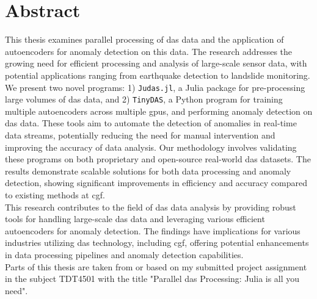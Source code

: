 \chapter*{Abstract}

This thesis examines parallel processing of \acrfull{das} data and the application of autoencoders for anomaly detection on this data. The research addresses the growing need for efficient processing and analysis of large-scale sensor data, with potential applications ranging from earthquake detection to landslide monitoring. \\

We present two novel programs: 1) \texttt{Judas.jl}, a Julia package for pre-processing large volumes of \acrshort{das} data, and 2) \texttt{TinyDAS}, a Python program for training multiple autoencoders across multiple \acrshort{gpu}s, and performing anomaly detection on \acrshort{das} data. These tools aim to automate the detection of anomalies in real-time data streams, potentially reducing the need for manual intervention and improving the accuracy of data analysis.
Our methodology involves validating these programs on both proprietary and open-source real-world \acrshort{das} datasets. The results demonstrate scalable solutions for both data processing and anomaly detection, showing significant improvements in efficiency and accuracy compared to existing methods at \acrfull{cgf}. \\

This research contributes to the field of \acrshort{das} data analysis by providing robust tools for handling large-scale \acrshort{das} data and leveraging various efficient autoencoders for anomaly detection. The findings have implications for various industries utilizing \acrshort{das} technology, including \acrfull{cgf}, offering potential enhancements in data processing pipelines and anomaly detection capabilities. \\

Parts of this thesis are taken from or based on my submitted project assignment in the subject TDT4501 with the title "Parallel \acrshort{das} Processing: Julia is all you need".